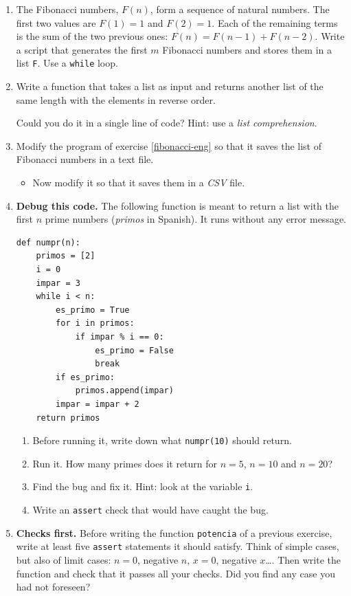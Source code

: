 \begin{enumerate}
\item The Fibonacci numbers, $F(n)$, form a sequence of natural numbers. The first two values are $F(1)=1$ and $F(2)=1$. Each of the remaining terms is the sum of the two previous ones: $F(n) = F(n-1) + F(n-2)$.
Write a script that generates the first $m$ Fibonacci numbers and stores them in a list \verb|F|. Use a \verb|while| loop.\label{fibonacci-eng}

\item Write a function that takes a list as input and returns another list of the same length with the elements in reverse order.

Could you do it in a single line of code? Hint: use a \emph{list comprehension}.

\item Modify the program of exercise \ref{fibonacci-eng} so that it saves the list of Fibonacci numbers in a text file.
\begin{itemize}
    \item Now modify it so that it saves them in a \emph{CSV} file.
\end{itemize}

\item \textbf{Debug this code.} The following function is meant to return a list with the first $n$ prime numbers (\emph{primos} in Spanish). It runs without any error message.
\begin{verbatim}
def numpr(n):
    primos = [2]
    i = 0
    impar = 3
    while i < n:
        es_primo = True
        for i in primos:
            if impar % i == 0:
                es_primo = False
                break
        if es_primo:
            primos.append(impar)
        impar = impar + 2
    return primos
\end{verbatim}
\begin{enumerate}
\item Before running it, write down what \texttt{numpr(10)} should return.
\item Run it. How many primes does it return for $n=5$, $n=10$ and $n=20$?
\item Find the bug and fix it. Hint: look at the variable \texttt{i}.
\item Write an \texttt{assert} check that would have caught the bug.
\end{enumerate}

\item \textbf{Checks first.} Before writing the function \verb|potencia| of a previous exercise, write at least five \texttt{assert} statements it should satisfy. Think of simple cases, but also of limit cases: $n=0$, negative $n$, $x=0$, negative $x$\ldots. Then write the function and check that it passes all your checks. Did you find any case you had not foreseen?


\end{enumerate}
